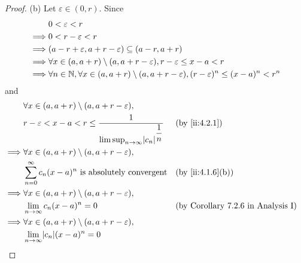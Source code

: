 \begin{proof}{(b)}
  Let \(\varepsilon \in (0, r)\).
  Since
  \begin{align*}
             & 0 < \varepsilon < r                                                                                                     \\
    \implies & 0 < r - \varepsilon < r                                                                                                 \\
    \implies & (a - r + \varepsilon, a + r - \varepsilon) \subseteq (a - r, a + r)                                                     \\
    \implies & \forall x \in (a, a + r) \setminus (a, a + r - \varepsilon), r - \varepsilon \leq x - a < r                             \\
    \implies & \forall n \in \mathbb{N}, \forall x \in (a, a + r) \setminus (a, a + r - \varepsilon), (r - \varepsilon)^n \leq (x - a)^n < r^n
  \end{align*}
  and
  \begin{align*}
             & \forall x \in (a, a + r) \setminus (a, a + r - \varepsilon),                                                                               \\
             & r - \varepsilon < x - a < r \leq \dfrac{1}{\limsup_{n \to \infty} \abs{c_n}^{\dfrac{1}{n}}} &  & \by{ii:4.2.1}                             \\
    \implies & \forall x \in (a, a + r) \setminus (a, a + r - \varepsilon),                                                                               \\
             & \sum_{n = 0}^\infty c_n (x - a)^n \text{ is absolutely convergent}                          &  & \by{ii:4.1.6}[b]                          \\
    \implies & \forall x \in (a, a + r) \setminus (a, a + r - \varepsilon),                                                                               \\
             & \lim_{n \to \infty} c_n (x - a)^n = 0                                                       &  & \text{(by Corollary 7.2.6 in Analysis I)} \\
    \implies & \forall x \in (a, a + r) \setminus (a, a + r - \varepsilon),                                                                               \\
             & \lim_{n \to \infty} \abs{c_n} (x - a)^n = 0                                                                                                \\

\end{align*}
\end{proof}
